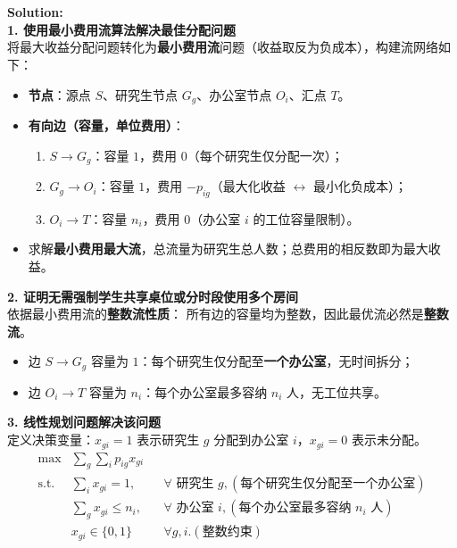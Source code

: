 \documentclass{article}
\newcounter{exercise}
\newcommand{\<}{
    \langle}
\renewcommand{\>}{
    \rangle}
\begin{document}
{\begin{exercise}
\end{exercise}
\\\\
\noindent\textbf{Solution:}
\\
\textbf{1. 使用最小费用流算法解决最佳分配问题}\\
将最大收益分配问题转化为\textbf{最小费用流}问题（收益取反为负成本），构建流网络如下：
\begin{itemize}
    \item \textbf{节点}：源点 $S$、研究生节点 $G_g$、办公室节点 $O_i$、汇点 $T$。
    \item \textbf{有向边（容量，单位费用）}：
    \begin{enumerate}
        \item $S \to G_g$：容量 $1$，费用 $0$（每个研究生仅分配一次）；
        \item $G_g \to O_i$：容量 $1$，费用 $-p_{ig}$（最大化收益 $\leftrightarrow$ 最小化负成本）；
        \item $O_i \to T$：容量 $n_i$，费用 $0$（办公室 $i$ 的工位容量限制）。
    \end{enumerate}
    \item 求解\textbf{最小费用最大流}，总流量为研究生总人数；总费用的相反数即为最大收益。
\end{itemize}
\textbf{2. 证明无需强制学生共享桌位或分时段使用多个房间}\\
依据最小费用流的\textbf{整数流性质}：
所有边的容量均为整数，因此最优流必然是\textbf{整数流}。
\begin{itemize}
    \item 边 $S \to G_g$ 容量为 $1$：每个研究生仅分配至\textbf{一个办公室}，无时间拆分；
    \item 边 $O_i \to T$ 容量为 $n_i$：每个办公室最多容纳 $n_i$ 人，无工位共享。
\end{itemize}
\textbf{3. 线性规划问题解决该问题}\\
定义决策变量：$x_{gi}=1$ 表示研究生 $g$ 分配到办公室 $i$，$x_{gi}=0$ 表示未分配。
\begin{align*}
    \max &\sum_{g} \sum_{i} p_{ig} x_{gi} && \\
    \text{s.t.} &\sum_{i} x_{gi} = 1, &&\forall \text{ 研究生 } g, (\text{每个研究生仅分配至一个办公室})\\
    &\sum_{g} x_{gi} \leq n_i, &&\forall \text{ 办公室 } i, (\text{每个办公室最多容纳 } n_i \text{ 人})\\
	&x_{gi} \in \{0,1\} &&\forall g,i. (\text{整数约束})
\end{align*}




}
\end{document}
